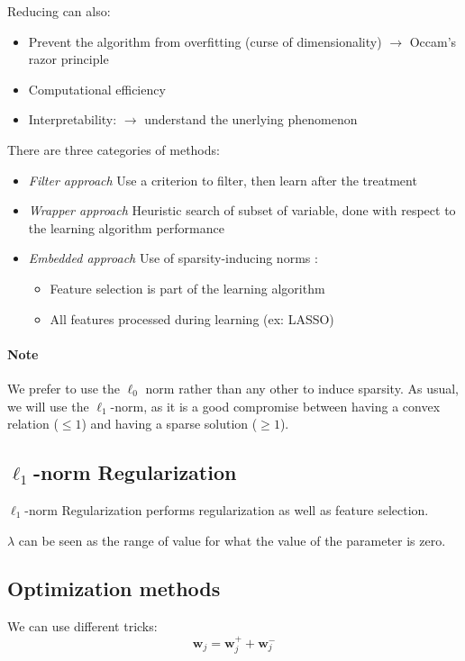 \documentclass{article}
\begin{document}
Reducing can also:
\begin{itemize}
\item Prevent the algorithm from overfitting (curse of dimensionality) $\to$ Occam's razor principle
\item Computational efficiency
\item Interpretability: $\to$ understand the unerlying phenomenon
\end{itemize}


There are three categories of methods:
\begin{itemize}
\item \emph{Filter approach} Use a criterion to filter, then learn after the treatment
\item \emph{Wrapper approach} Heuristic search of subset of variable, done with respect to the learning algorithm performance
\item \emph{Embedded approach} Use of sparsity-inducing norms :
\begin{itemize}
\item Feature selection is part of the learning algorithm
\item All features processed during learning (ex: LASSO)
\end{itemize}
\end{itemize}

\paragraph{Note}
We prefer to use the $\ell_0$ norm rather than any other to induce sparsity. As usual, we will use the $\ell_1$-norm, as it is a good compromise between having a convex relation ($\leq 1$) and having a sparse solution ($\geq 1$).

\subsection{$\ell_1$-norm Regularization}
$\ell_1$-norm Regularization performs regularization as well as feature selection.

$\lambda$ can be seen as the range of value for what the value of the parameter is zero.


\subsection{Optimization methods}
We can use different tricks:
\[\mathbf{w}_j = \mathbf{w}_j^+ + \mathbf{w}_j^-\]
\end{document}
